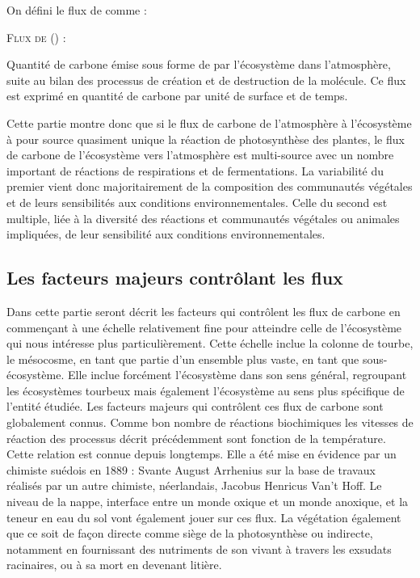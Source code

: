 On défini le flux de \chh comme : 
\begin{pdef}
\textsc{Flux de \chh (\fchh)} :

Quantité de carbone émise sous forme de \chh par l'écosystème dans l'atmosphère, suite au bilan des processus de création et de destruction de la molécule.
Ce flux est exprimé en quantité de carbone par unité de surface et de temps.
\end{pdef}




Cette partie montre donc que si le flux de carbone de l'atmosphère à l'écosystème à pour source quasiment unique la réaction de photosynthèse des plantes, le flux de carbone de l'écosystème vers l'atmosphère est multi-source avec un nombre important de réactions de respirations et de fermentations.
La variabilité du premier vient donc majoritairement de la composition des communautés végétales et de leurs sensibilités aux conditions environnementales.
Celle du second est multiple, liée à la diversité des réactions et communautés végétales ou animales impliquées, de leur sensibilité aux conditions environnementales.

\subsection{Les facteurs majeurs contrôlant les flux}

Dans cette partie seront décrit les facteurs qui contrôlent les flux de carbone en commençant à une échelle relativement fine pour atteindre celle de l'écosystème qui nous intéresse plus particulièrement.
Cette échelle inclue la colonne de tourbe, le mésocosme, en tant que partie d'un ensemble plus vaste, en tant que sous-écosystème. 
Elle inclue forcément l'écosystème dans son sens général, regroupant les écosystèmes tourbeux mais également l'écosystème au sens plus spécifique de l'entité étudiée.
Les facteurs majeurs qui contrôlent ces flux de carbone sont globalement connus.
Comme bon nombre de réactions biochimiques les vitesses de réaction des processus décrit précédemment sont fonction de la température.
Cette relation est connue depuis longtemps.
Elle a été mise en évidence par un chimiste suédois en 1889 : Svante August Arrhenius sur la base de travaux réalisés par un autre chimiste, néerlandais, Jacobus Henricus Van't Hoff.
Le niveau de la nappe, interface entre un monde oxique et un monde anoxique, et la teneur en eau du sol vont également jouer sur ces flux.
La végétation également que ce soit de façon directe comme siège de la photosynthèse ou indirecte, notamment en fournissant des nutriments de son vivant à travers les exsudats racinaires, ou à sa mort en devenant litière.


